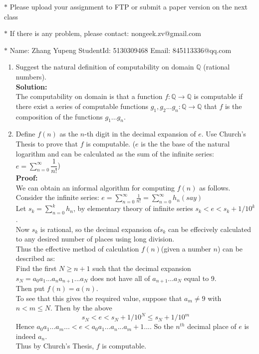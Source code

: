 \documentclass[12pt,a4paper]{article}
\theoremstyle{definition}
\numberwithin{equation}{section}
\numberwithin{figure}{section}
\begin{document}
\noindent{}
\begin{center}
\footnotesize{\color{red}$*$ Please upload your assignment to FTP or submit a paper version on the next class}

\footnotesize{\color{red}$*$ If there is any problem, please contact: nongeek.zv@gmail.com }

\footnotesize{\color{blue}$*$ Name: Zhang Yupeng \quad StudentId: 5130309468 \quad Email: 845113336@qq.com}
\end{center}


\begin{enumerate}%

  \item Suggest the natural definition of computability on domain $\mathbb{Q}$ (rational numbers).\\
\textbf{Solution:}\\
The computability on domain  is that a function $f: \mathbb{Q} \rightarrow \mathbb{Q}$ is computable if there exist a series of computable functions $g_1,g_2...g_n: \mathbb{Q} \rightarrow \mathbb{Q}$ that $f$ is the composition of the functions $g_1...g_n$.\\
 
 \item Define $f(n)$ as the $n$-th digit in the decimal expansion of $e$. Use Church's Thesis to prove that $f$ is computable. ($e$ is the the base of the natural logarithm and can be calculated as the sum of the infinite series: $e = \sum\limits_{n=0}^{\infty}\dfrac{1}{n!}$)\\
\textbf{Proof:}\\
We can obtain an informal algorithm for computing $f(n)$ as follows.\\
Consider the infinite series: $e = \sum_{n=0}^{\infty} \frac{1}{n!} = \sum_{n=0}^{\infty}h_n(say)$\\
Let $s_k = \sum_{n=0}^{k}h_n$, by elementary theory of infinite series $s_k < e < s_k + 1/10^k$.\\
Now $s_k$ is rational, so the decimal expansion of$s_k$ can be effecively calculated to any desired number of places using long division.\\
Thus the effective method of calculation $f(n)$(given a number $n$) can be described as:\\
Find the first $N \geq n+1 $ such that the decimal expansion $s_N = a_0a_1...a_na_{n+1}...a_N$ does not have all of $a_{n+1}...a_N$ equal to 9.\\
Then put $f(n) = a(n)$.\\
To see that this gives the required value, suppose that $a_m \neq 9$ with $n < m \leq N$. Then by the above
$$s_N < e < s_N+1/10^N \leq s_N +1/10^m$$
Hence $a_0a_1...a_m... < e < a_0a_1...a_n...a_m+1...$. So the $n^{th}$ decimal place of $e$ is indeed $a_n$.\\
Thus by Church's Thesis, $f$ is computable.\\



\end{enumerate}
\end{document}
